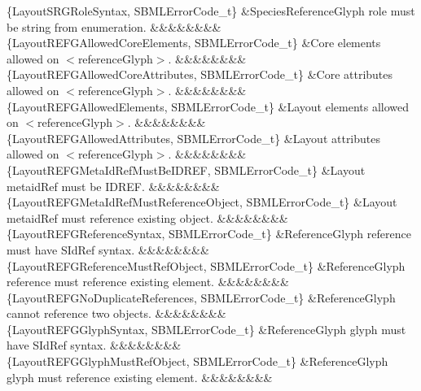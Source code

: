 \begin{DoxyParagraph}{}
\begin{longtabu}
\{Layout\+S\+R\+G\+Role\+Syntax, S\+B\+M\+L\+Error\+Code\+\_\+t\} &Species\+Reference\+Glyph \textquotesingle{}role\textquotesingle{} must be string from enumeration. &&&&&&&&\\
\{Layout\+R\+E\+F\+G\+Allowed\+Core\+Elements, S\+B\+M\+L\+Error\+Code\+\_\+t\} &Core elements allowed on {\ttfamily $<$reference\+Glyph$>$}. &&&&&&&&\\
\{Layout\+R\+E\+F\+G\+Allowed\+Core\+Attributes, S\+B\+M\+L\+Error\+Code\+\_\+t\} &Core attributes allowed on {\ttfamily $<$reference\+Glyph$>$}. &&&&&&&&\\
\{Layout\+R\+E\+F\+G\+Allowed\+Elements, S\+B\+M\+L\+Error\+Code\+\_\+t\} &Layout elements allowed on {\ttfamily $<$reference\+Glyph$>$}. &&&&&&&&\\
\{Layout\+R\+E\+F\+G\+Allowed\+Attributes, S\+B\+M\+L\+Error\+Code\+\_\+t\} &Layout attributes allowed on {\ttfamily $<$reference\+Glyph$>$}. &&&&&&&&\\
\{Layout\+R\+E\+F\+G\+Meta\+Id\+Ref\+Must\+Be\+I\+D\+R\+EF, S\+B\+M\+L\+Error\+Code\+\_\+t\} &Layout \textquotesingle{}metaid\+Ref\textquotesingle{} must be I\+D\+R\+EF. &&&&&&&&\\
\{Layout\+R\+E\+F\+G\+Meta\+Id\+Ref\+Must\+Reference\+Object, S\+B\+M\+L\+Error\+Code\+\_\+t\} &Layout \textquotesingle{}metaid\+Ref\textquotesingle{} must reference existing object. &&&&&&&&\\
\{Layout\+R\+E\+F\+G\+Reference\+Syntax, S\+B\+M\+L\+Error\+Code\+\_\+t\} &Reference\+Glyph \textquotesingle{}reference\textquotesingle{} must have S\+Id\+Ref syntax. &&&&&&&&\\
\{Layout\+R\+E\+F\+G\+Reference\+Must\+Ref\+Object, S\+B\+M\+L\+Error\+Code\+\_\+t\} &Reference\+Glyph \textquotesingle{}reference\textquotesingle{} must reference existing element. &&&&&&&&\\
\{Layout\+R\+E\+F\+G\+No\+Duplicate\+References, S\+B\+M\+L\+Error\+Code\+\_\+t\} &Reference\+Glyph cannot reference two objects. &&&&&&&&\\
\{Layout\+R\+E\+F\+G\+Glyph\+Syntax, S\+B\+M\+L\+Error\+Code\+\_\+t\} &Reference\+Glyph \textquotesingle{}glyph\textquotesingle{} must have S\+Id\+Ref syntax. &&&&&&&&\\
\{Layout\+R\+E\+F\+G\+Glyph\+Must\+Ref\+Object, S\+B\+M\+L\+Error\+Code\+\_\+t\} &Reference\+Glyph \textquotesingle{}glyph\textquotesingle{} must reference existing element. &&&&&&&&\\

\end{longtabu}
\end{DoxyParagraph}
